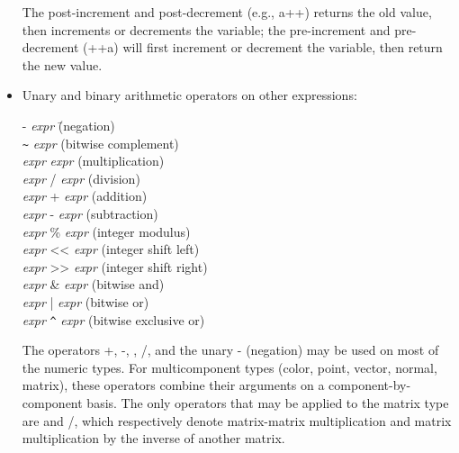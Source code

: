 \documentclass[11pt,letterpaper]{book}
\def\color{{\cf color}\xspace}
\def\matrix{{\cf matrix}\xspace}
\def\normal{{\cf normal}\xspace}
\def\point{{\cf point}\xspace}
\def\vector{{\cf vector}\xspace}
\begin{document}
\begin{itemize}
The post-increment and post-decrement (e.g., {\cf a++}) returns the old
value, then increments or decrements the variable; the pre-increment and
pre-decrement ({\cf ++a}) will first increment or decrement the
variable, then return the new value.

\item Unary and binary arithmetic operators on other expressions:

\begin{tabbing}
\hspace{0.25in} {\cf -} \emph{expr} \hspace{1in} \= (negation) \\
\hspace{0.25in} \verb|~| \emph{expr} \> (bitwise complement) \\
\hspace{0.25in} \emph{expr} {\cf *} \emph{expr} \> (multiplication) \\
\hspace{0.25in} \emph{expr} {\cf /} \emph{expr} \> (division) \\
\hspace{0.25in} \emph{expr} {\cf +} \emph{expr} \> (addition) \\
\hspace{0.25in} \emph{expr} {\cf -} \emph{expr} \> (subtraction) \\
\hspace{0.25in} \emph{expr} {\cf \%} \emph{expr} \> (integer modulus) \\
\hspace{0.25in} \emph{expr} {\cf <<} \emph{expr} \> (integer shift left) \\
\hspace{0.25in} \emph{expr} {\cf >>} \emph{expr} \> (integer shift right) \\
\hspace{0.25in} \emph{expr} {\cf \&} \emph{expr} \> (bitwise and) \\
\hspace{0.25in} \emph{expr} {\cf |} \emph{expr} \> (bitwise or) \\
\hspace{0.25in} \emph{expr} \verb|^| \emph{expr} \> (bitwise exclusive or) \\
\end{tabbing}

The operators {\cf +}, {\cf -}, {\cf *}, {\cf /}, and the unary {\cf -}
(negation) may be used on most of the numeric types.  For multicomponent
types (\color, \point, \vector, \normal, \matrix), these operators
combine their arguments on a component-by-component basis.
The only operators that may be applied to the \matrix type are
{\cf *} and {\cf /}, which respectively denote matrix-matrix
multiplication and matrix multiplication by the inverse of another
matrix.


\end{itemize}
\end{document}
